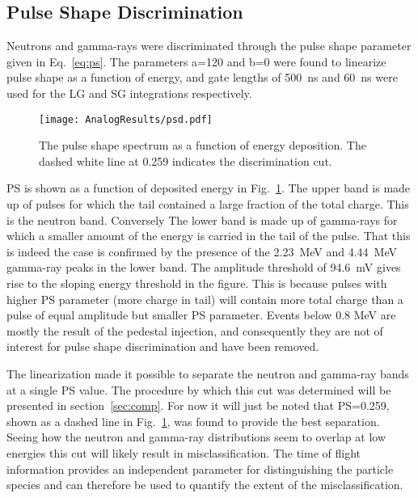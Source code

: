 \documentclass[main.tex]{subfiles}
\begin{document}
\subsection{Pulse Shape Discrimination}
Neutrons and gamma-rays were discriminated through the pulse shape parameter given in Eq.~\ref{eq:ps}. The parameters a=120 and b=0 were found to linearize pulse shape as a function of energy, and gate lengths of \SI{500}{\ns} and \SI{60}{ns} were used for the LG and SG integrations respectively.

\begin{figure}[ht]
    \centering
        \texttt{[image: AnalogResults/psd.pdf]}
        \caption[PSD spectrum, analog setup.]{The pulse shape spectrum as a function of energy deposition. The dashed white line at 0.259 indicates the discrimination cut.}
        \label{fig:psd_a}
\end{figure}

PS is shown as a function of deposited energy in Fig.~\ref{fig:psd_a}. The upper band is made up of pulses for which the tail contained a large fraction of the total charge. This is the neutron band. Conversely The lower band is made up of gamma-rays for which a smaller amount of the energy is carried in the tail of the pulse. That this is indeed the case is confirmed by the presence of the \SI{2.23}{MeV} and \SI{4.44}{MeV} gamma-ray peaks in the lower band. The amplitude threshold of \SI{94.6}{mV} gives rise to the sloping energy threshold in the figure. This is because pulses with higher PS parameter (more charge in tail) will contain more total charge than a pulse of equal amplitude but smaller PS parameter.
Events below 0.8 MeV are mostly the result of the pedestal injection, and consequently they are not of interest for pulse shape discrimination and have been removed.

The linearization made it possible to separate the neutron and gamma-ray bands at a single PS value. The procedure by which this cut was determined will be presented in section~\ref{sec:comp}. For now it will just be noted that PS=0.259, shown as a dashed line in Fig.~\ref{fig:psd_a}, was found to provide the best separation. Seeing how the neutron and gamma-ray distributions seem to overlap at low energies this cut will likely result in misclassification. The time of flight information provides an independent parameter for distinguishing the particle species and can therefore be used to quantify the extent of the misclassification.
\end{document}
